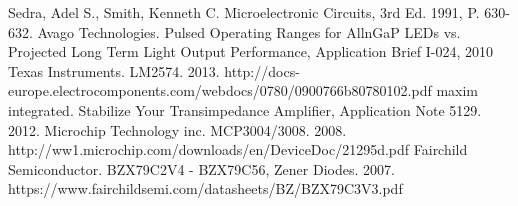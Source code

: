 \begin{thebibliography}{11}
		Sedra, Adel S., Smith, Kenneth C. Microelectronic Circuits, 3rd Ed. 1991, P. 630-632.
		Avago Technologies. Pulsed Operating Ranges for AllnGaP LEDs vs. Projected Long Term Light Output Performance, Application Brief I-024, 2010
		Texas Instruments. LM2574. 2013. http://docs-europe.electrocomponents.com/webdocs/0780/0900766b80780102.pdf
		maxim integrated. Stabilize Your Transimpedance Amplifier, Application Note 5129. 2012.
		Microchip Technology inc. MCP3004/3008. 2008. http://ww1.microchip.com/downloads/en/DeviceDoc/21295d.pdf
		Fairchild Semiconductor. BZX79C2V4 - BZX79C56, Zener Diodes. 2007. https://www.fairchildsemi.com/datasheets/BZ/BZX79C3V3.pdf
\end{thebibliography}